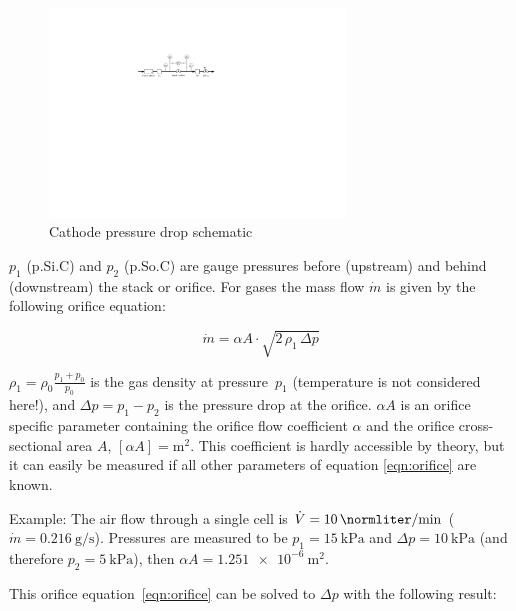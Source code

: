 \documentclass[11pt,a4paper,english,twoside]{scrreprt}
\begin{document}
\begin{figure}
  \centering
  \includegraphics*[width=0.7\textwidth,angle=0]{FCF_Figure_Cathode_pressure_drop.pdf}
  \caption[Cathode pressure drop schematic]{Cathode pressure drop schematic}
  \label{fig:Cathode_Subsystem}
\end{figure}

$p_1$ (p.Si.C) and $p_2$ (p.So.C) are gauge pressures before (upstream) and behind (downstream) the stack or orifice. For gases the mass flow $\dot m$ is given by the following orifice equation:

\begin{equation}
  \label{eqn:orifice}
  \dot m = \alpha A \cdot \sqrt{2\, \rho_1\, \Delta p} 
\end{equation}

$\rho_1 = \rho_0\frac{p_1+p_0}{p_0}$ is the gas density at pressure~$p_1$ (temperature is not considered here!), and $\Delta p=p_1-p_2$ is the pressure drop at the orifice. $\alpha A$ is an orifice specific parameter containing the orifice flow coefficient $\alpha$ and the orifice cross-sectional area $A$, $[\alpha A] = \si{\meter\squared}$. This coefficient is hardly accessible by theory, but it can easily be measured if all other parameters of equation \ref{eqn:orifice} are known.

Example: The air flow through a single cell is $\dot V = \SI{10}{\normliter\per\minute}$ ($\dot m = \SI{0.216}{\gram\per\second}$). Pressures are measured to be
$p_1 = \SI{15}{\kPa}$ and $\Delta p = \SI{10}{\kPa}$ (and therefore $p_2 = \SI{5}{\kPa}$), then $\alpha A = \SI{1.251e-6}{\meter\squared}$.


This orifice equation~\ref{eqn:orifice} can be solved to $\Delta p$ with the following result: 
\end{document}
